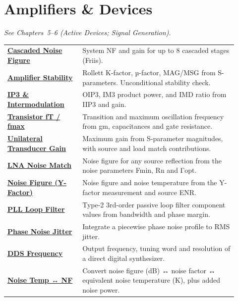 \section*{Amplifiers \& Devices}
\noindent\emph{See Chapters~5--6 (Active Devices; Signal Generation).}
\begin{longtable}{>{\raggedright\arraybackslash}p{0.30\linewidth}>{\raggedright\arraybackslash}p{0.62\linewidth}}
\hline
\href{https://rftoolbox.ca/NoiseFigure.html}{\textbf{Cascaded Noise Figure}} & System NF and gain for up to 8 cascaded stages (Friis). \\
\href{https://rftoolbox.ca/AmpStability.html}{\textbf{Amplifier Stability}} & Rollett K-factor, µ-factor, MAG/MSG from S-parameters. Unconditional stability check. \\
\href{https://rftoolbox.ca/IP3Calc.html}{\textbf{IP3 \& Intermodulation}} & OIP3, IM3 product power, and IMD ratio from IIP3 and gain. \\
\href{https://rftoolbox.ca/TransistorFT.html}{\textbf{Transistor fT / fmax}} & Transition and maximum oscillation frequency from gm, capacitances and gate resistance. \\
\href{https://rftoolbox.ca/TransducerGain.html}{\textbf{Unilateral Transducer Gain}} & Maximum gain from S-parameter magnitudes, with source and load match contributions. \\
\href{https://rftoolbox.ca/LNAMatch.html}{\textbf{LNA Noise Match}} & Noise figure for any source reflection from the noise parameters Fmin, Rn and Γopt. \\
\href{https://rftoolbox.ca/NFYFactor.html}{\textbf{Noise Figure (Y-Factor)}} & Noise figure and noise temperature from the Y-factor measurement and source ENR. \\
\href{https://rftoolbox.ca/PLLFilter.html}{\textbf{PLL Loop Filter}} & Type-2 3rd-order passive loop filter component values from bandwidth and phase margin. \\
\href{https://rftoolbox.ca/PhaseNoiseJitter.html}{\textbf{Phase Noise   Jitter}} & Integrate a piecewise phase noise profile to RMS jitter. \\
\href{https://rftoolbox.ca/DDS.html}{\textbf{DDS Frequency}} & Output frequency, tuning word and resolution of a direct digital synthesizer. \\
\href{https://rftoolbox.ca/NoiseTempNF.html}{\textbf{Noise Temp ↔ NF}} & Convert noise figure (dB) ↔ noise factor ↔ equivalent noise temperature (K), plus added noise power. \\

\end{longtable}
